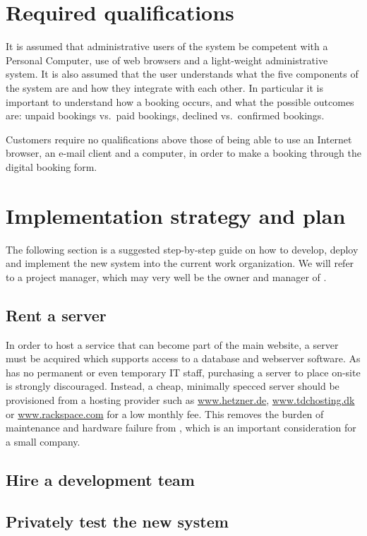 \section{Required qualifications}
It is assumed that administrative users of the system  be competent with a Personal Computer, 
use of web browsers and a light-weight administrative system. It is also assumed that the
user understands what the five components of the system are and
how they integrate with each other. In particular it is important to understand
how a booking occurs, and what the possible outcomes are: unpaid bookings vs.\ 
paid bookings, declined vs.\ confirmed bookings.

Customers require no qualifications above those of being able to use an Internet
browser, an e-mail client and a computer, in order to make a booking through the 
digital booking form.

\newpage
\section{Implementation strategy and plan}
The following section is a suggested step-by-step guide on how to develop, 
deploy and implement the new system into the current work organization. We 
will refer to a project manager, which may very well be the owner and 
manager of \gomonkey{}.

\subsection{Rent a server}
In order to host a service that can become part of the main website, a server
must be acquired which supports access to a database and webserver software. As
\gomonkey{} has no permanent or even temporary IT staff, purchasing a server to
place on-site is strongly discouraged. Instead, a cheap, minimally specced server 
should be provisioned from a hosting provider such as \url{www.hetzner.de}, 
\url{www.tdchosting.dk} or \url{www.rackspace.com} for a low monthly fee. This
removes the burden of maintenance and hardware failure from \gomonkey{}, which
is an important consideration for a small company.

\subsection{Hire a development team}

\subsection{Privately test the new system}

